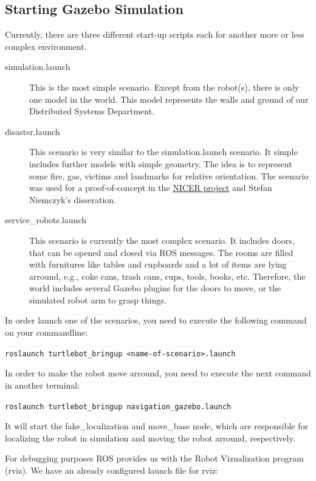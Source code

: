 \subsection{Starting Gazebo Simulation}
\label{ssec:StartSimulation}

Currently, there are three different start-up scripts \textemdash each for another more or less complex environment. 

\begin{description}
  \item[simulation.launch] This is the most simple scenario. Except from the robot(s), there is only one model in the world. This model represents the walls and ground of our Distributed Systems Department.
  \item[disaster.launch] This scenario is very similar to the simulation.launch scenario. It simple includes further models with simple geometry. The idea is to represent some fire, gas, victims and landmarks for relative orientation. The scenario was used for a proof-of-concept in the \href{http://www.uni-kassel.de/eecs/fachgebiete/vs/research/nicer.html}{NICER project} and Stefan Niemczyk's disseration. 
  \item[service\_robots.launch] This scenario is currently the most complex scenario. It includes doors, that can be opened and closed via ROS messages. The rooms are filled with furnitures like tables and cupboards and a lot of items are lying arround, e.g., coke cans, trash cans, cups, tools, books, etc. Therefore, the world includes several Gazebo plugins for the doors to move, or the simulated robot arm to grasp things.
\end{description}

In order launch one of the scenarios, you need to execute the following command on your commandline:

\verb$roslaunch turtlebot_bringup <name-of-scenario>.launch$

In order to make the robot move arround, you need to execute the next command in another terminal:

\verb$roslaunch turtlebot_bringup navigation_gazebo.launch$

It will start the fake\_localization and move\_base node, which are responsible for localizing the robot in simulation and moving the robot arround, respectively.

For debugging purposes ROS provides us with the Robot Vizualization program (rviz). We have an already configured launch file for rviz:

